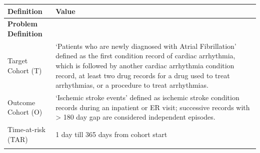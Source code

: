 \documentclass[]{book}
\begin{document}
\begin{longtable}[]{@{}ll@{}}
\toprule
\begin{minipage}[b]{0.42\columnwidth}\raggedright\strut
Definition\strut
\end{minipage} & \begin{minipage}[b]{0.51\columnwidth}\raggedright\strut
Value\strut
\end{minipage}\tabularnewline
\midrule
\endhead
\begin{minipage}[t]{0.42\columnwidth}\raggedright\strut
\textbf{Problem Definition}\strut
\end{minipage} & \begin{minipage}[t]{0.51\columnwidth}\raggedright\strut
\strut
\end{minipage}\tabularnewline
\begin{minipage}[t]{0.42\columnwidth}\raggedright\strut
Target Cohort (T)\strut
\end{minipage} & \begin{minipage}[t]{0.51\columnwidth}\raggedright\strut
`Patients who are newly diagnosed with Atrial Fibrillation' defined as
the first condition record of cardiac arrhythmia, which is followed by
another cardiac arrhythmia condition record, at least two drug records
for a drug used to treat arrhythmias, or a procedure to treat
arrhythmias.\strut
\end{minipage}\tabularnewline
\begin{minipage}[t]{0.42\columnwidth}\raggedright\strut
Outcome Cohort (O)\strut
\end{minipage} & \begin{minipage}[t]{0.51\columnwidth}\raggedright\strut
`Ischemic stroke events' defined as ischemic stroke condition records
during an inpatient or ER visit; successive records with \textgreater{}
180 day gap are considered independent episodes.\strut
\end{minipage}\tabularnewline
\begin{minipage}[t]{0.42\columnwidth}\raggedright\strut
Time-at-risk (TAR)\strut
\end{minipage} & \begin{minipage}[t]{0.51\columnwidth}\raggedright\strut
1 day till 365 days from cohort start\strut
\end{minipage}\tabularnewline
\begin{minipage}[t]{0.42\columnwidth}\raggedright\strut
\strut
\end{minipage} & \begin{minipage}[t]{0.51\columnwidth}\raggedright\strut

\end{minipage}
\end{longtable}
\end{document}
